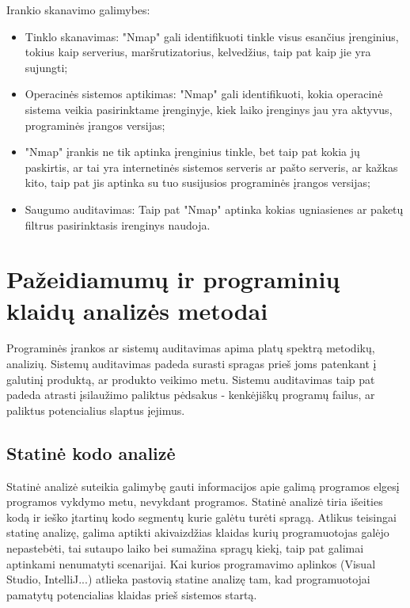 \documentclass[a4paper,12pt,fleqn]{article}
\begin{document}
Irankio skanavimo galimybes:
\begin{itemize}
	\item Tinklo skanavimas: "Nmap" gali identifikuoti tinkle visus esančius įrenginius, tokius kaip serverius, maršrutizatorius, kelvedžius, taip pat kaip jie yra sujungti;
	\item Operacinės sistemos aptikimas: "Nmap" gali identifikuoti, kokia operacinė sistema veikia pasirinktame įrenginyje, kiek laiko įrenginys jau yra aktyvus, programinės įrangos versijas;
	\item "Nmap" įrankis ne tik aptinka įrenginius tinkle, bet taip pat kokia jų paskirtis, ar tai yra internetinės sistemos serveris ar pašto serveris, ar kažkas kito, taip pat jis aptinka su tuo susijusios programinės įrangos versijas;
	\item Saugumo auditavimas: Taip pat "Nmap" aptinka kokias ugniasienes ar paketų filtrus pasirinktasis irenginys naudoja.
\end{itemize}

\newpage
\section{Pažeidiamumų ir programinių klaidų analizės metodai}
\label{sec:sec2}

Programinės įrankos ar sistemų auditavimas apima platų spektrą metodikų, analizių. Sistemų auditavimas padeda surasti spragas prieš joms patenkant į galutinį produktą, ar produkto veikimo metu. Sistemu auditavimas taip pat padeda atrasti įsilaužimo paliktus pėdsakus - kenkėjiškų programų failus, ar paliktus potencialius slaptus įejimus. 

\subsection{Statinė kodo analizė}
\label{sec:example}

\label{sec:data}
Statinė analizė suteikia galimybę gauti informacijos apie galimą programos elgesį programos vykdymo metu, nevykdant programos. Statinė analizė tiria išeities kodą ir ieško įtartinų kodo segmentų kurie galėtu turėti spragą. Atlikus teisingai statinę analizę, galima aptikti akivaizdžias klaidas kurių programuotojas galėjo nepastebėti, tai sutaupo laiko bei sumažina spragų kiekį, taip pat galimai aptinkami nenumatyti scenarijai\cite{Cowan:2003:SSO:858866.859050}. Kai kurios programavimo aplinkos (Visual Studio, IntelliJ...) atlieka pastovią statine analizę tam, kad programuotojai pamatytų potencialias klaidas prieš sistemos startą. 
\end{document}
